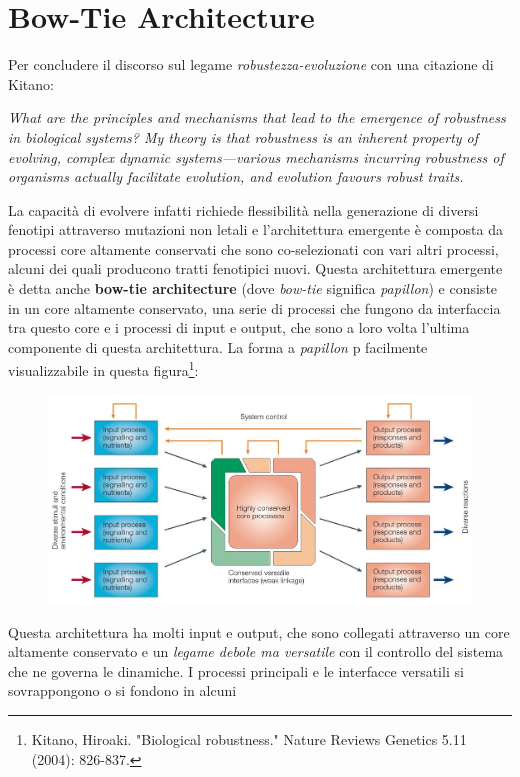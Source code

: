 \documentclass[a4paper,12pt, oneside]{book}
\begin{document}
\section{Bow-Tie Architecture}
Per concludere il discorso sul legame \textit{robustezza-evoluzione} con una
citazione di Kitano:
\begin{center}
  \textit{What are the principles and mechanisms that lead to the emergence of
    robustness in
    biological systems? My theory is that robustness is an inherent property of
    evolving, 
    complex dynamic systems—various mechanisms incurring robustness of organisms
    actually facilitate evolution, and evolution favours robust traits. }
\end{center}
La capacità di evolvere infatti richiede flessibilità nella generazione di
diversi fenotipi attraverso mutazioni non letali e l'architettura emergente è
composta da processi core altamente conservati che sono co-selezionati con vari
altri processi, alcuni dei quali producono tratti fenotipici nuovi. Questa
architettura emergente è detta anche \textbf{bow-tie architecture} (dove
\textit{bow-tie} significa \textit{papillon}) e consiste in un core altamente
conservato, una serie di processi che fungono da interfaccia tra questo core e i
processi di input e output, che sono a loro volta l'ultima componente di questa
architettura. La forma a \textit{papillon} p facilmente visualizzabile in questa
figura\footnote{Kitano, Hiroaki. "Biological robustness." Nature Reviews
  Genetics 5.11 (2004): 826-837.}:
\begin{figure}[H]
  \centering
  \includegraphics[scale = 0.3]{img/rob7.jpg}
\end{figure}
Questa architettura ha molti input e output, che sono collegati
attraverso un core altamente conservato e un \textit{legame debole ma
  versatile} con  
il controllo del sistema che ne governa le dinamiche. I processi
principali e le interfacce versatili si sovrappongono o si fondono in alcuni
\end{document}
